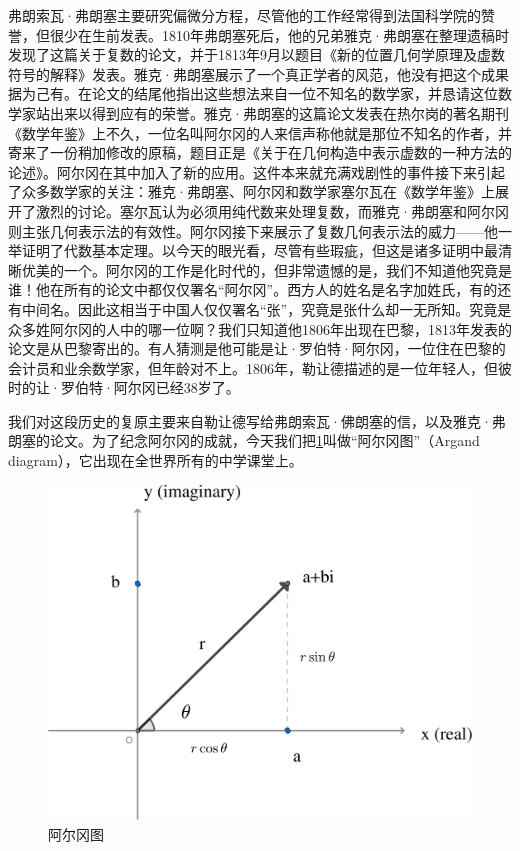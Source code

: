 \documentclass[b5paper]{ctexart}
\begin{document}
弗朗索瓦·弗朗塞主要研究偏微分方程，尽管他的工作经常得到法国科学院的赞誉，但很少在生前发表。1810年弗朗塞死后，他的兄弟雅克·弗朗塞在整理遗稿时发现了这篇关于复数的论文，并于1813年9月以题目《新的位置几何学原理及虚数符号的解释》发表。雅克·弗朗塞展示了一个真正学者的风范，他没有把这个成果据为己有。在论文的结尾他指出这些想法来自一位不知名的数学家，并恳请这位数学家站出来以得到应有的荣誉。雅克·弗朗塞的这篇论文发表在热尔岗的著名期刊《数学年鉴》上不久，一位名叫阿尔冈的人来信声称他就是那位不知名的作者，并寄来了一份稍加修改的原稿，题目正是《关于在几何构造中表示虚数的一种方法的论述》。阿尔冈在其中加入了新的应用。这件本来就充满戏剧性的事件接下来引起了众多数学家的关注：雅克·弗朗塞、阿尔冈和数学家塞尔瓦在《数学年鉴》上展开了激烈的讨论。塞尔瓦认为必须用纯代数来处理复数，而雅克·弗朗塞和阿尔冈则主张几何表示法的有效性。阿尔冈接下来展示了复数几何表示法的威力——他一举证明了代数基本定理。以今天的眼光看，尽管有些瑕疵，但这是诸多证明中最清晰优美的一个。阿尔冈的工作是化时代的，但非常遗憾的是，我们不知道他究竟是谁！他在所有的论文中都仅仅署名“阿尔冈”。西方人的姓名是名字加姓氏，有的还有中间名。因此这相当于中国人仅仅署名“张”，究竟是张什么却一无所知。究竟是众多姓阿尔冈的人中的哪一位啊？我们只知道他1806年出现在巴黎，1813年发表的论文是从巴黎寄出的。有人猜测是他可能是让·罗伯特·阿尔冈，一位住在巴黎的会计员和业余数学家，但年龄对不上。1806年，勒让德描述的是一位年轻人，但彼时的让·罗伯特·阿尔冈已经38岁了\cite{MacTour-Argand}。

我们对这段历史的复原主要来自勒让德写给弗朗索瓦·佛朗塞的信，以及雅克·弗朗塞的论文。为了纪念阿尔冈的成就，今天我们把\cref{fig:Argand-diagram}叫做“阿尔冈图”（Argand diagram），它出现在全世界所有的中学课堂上\cite{Weisstein-2025}。

\begin{figure}[htbp]
  \centering
  \includegraphics[scale=0.33]{img/argand-diagram}
  \caption{阿尔冈图}
 \label{fig:Argand-diagram}
\end{figure}
\end{document}
